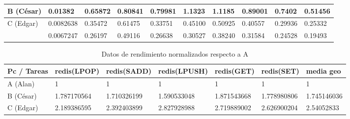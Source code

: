 \documentclass{article}
\begin{document}
\begin{enumerate}
{\begin{table}[H]
\begin{tabular}{|l|l|l|l|l|l|l|l|l|l|}
                \cellcolor[HTML]{FFFE65}{\color[HTML]{000000}}
                B (César) & 0.01382 & 0.65872 & 0.80841 & 0.79981 & 1.1323 
                & 1.1185 & 0.89001 & 0.7402 & 0.51456 \\ \hline
    
                
    
                \cellcolor[HTML]{34FF34}{\color[HTML]{000000}}
                C (Edgar) & 0.0082638 & 0.35472 & 0.61475 & 0.33751 & 0.45100 
                & 0.50925 & 0.40557 & 0.29936 & 0.25332\\ \hline
    
                
    
                \cellcolor[HTML]{9698ED}{\color[HTML]{000000} 
                D(Sandra)} & 0.0067247 & 0.26197 & 0.49116 & 0.26638 & 0.30527 
                & 0.38240 & 0.31584 & 0.24528 & 0.19493 \\ \hline
    
                
                \end{tabular}
            \end{table}
    
            \begin{table}[H]
                \caption*{Datos de rendimiento normalizados respecto a A}
                \begin{tabular}{|l|l|l|l|l|l|l|}
                \toprule
                    Pc / Tareas 
                    & \cellcolor[HTML]{DAE8FC}redis(LPOP) 
                    & \cellcolor[HTML]{DAE8FC}redis(SADD) 
                    & \cellcolor[HTML]{DAE8FC}redis(LPUSH) 
                    & \cellcolor[HTML]{DAE8FC}redis(GET)
                    & \cellcolor[HTML]{DAE8FC}redis(SET) 
                    & \cellcolor[HTML]{DAE8FC}media geo \\ \hline
    
                    \cellcolor[HTML]{F8A102}{\color[HTML]{000000}} 
                    A (Alan) & 1 & 1 & 1 & 1 & 1 & 1 \\ \hline
    
                    \cellcolor[HTML]{FFFE65}{\color[HTML]{000000}}
                    B (César) & 1.787170564 & 1.710326199 & 1.590533048 
                    & 1.871543668 & 1.778980806 & 1.745146036\\ \hline
    
    
                    \cellcolor[HTML]{34FF34}{\color[HTML]{000000}} 
                    C (Edgar) & 2.189386595 & 2.392403899 & 2.827928988 
                    & 2.719889002 & 2.626900204 & 2.54052833\\ \hline
    

\end{tabular}
\end{table}}
\end{enumerate}
\end{document}
